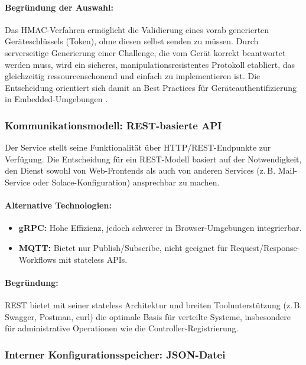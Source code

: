 \paragraph*{Begr\"undung der Auswahl:}

Das HMAC-Verfahren erm\"oglicht die Validierung eines vorab generierten Ger\"ateschl\"ussels (Token), ohne diesen selbst senden zu m\"ussen. Durch serverseitige Generierung einer Challenge, die vom Ger\"at korrekt beantwortet werden muss, wird ein sicheres, manipulationsresistentes Protokoll etabliert, das gleichzeitig ressourcenschonend und einfach zu implementieren ist. Die Entscheidung orientiert sich damit an Best Practices f\"ur Ger\"ateauthentifizierung in Embedded-Umgebungen \cite{rfc2104_hmac}.

\subsubsection*{Kommunikationsmodell: REST-basierte API}

Der Service stellt seine Funktionalit\"at \"uber HTTP/REST-Endpunkte zur Verf\"ugung. Die Entscheidung f\"ur ein REST-Modell basiert auf der Notwendigkeit, den Dienst sowohl von Web-Frontends als auch von anderen Services (z.\,B. Mail-Service oder Solace-Konfiguration) ansprechbar zu machen.

\paragraph*{Alternative Technologien:}
\begin{itemize}
  \item \textbf{gRPC:} Hohe Effizienz, jedoch schwerer in Browser-Umgebungen integrierbar.
  \item \textbf{MQTT:} Bietet nur Publish/Subscribe, nicht geeignet f\"ur Request/Response-Workflows mit stateless APIs.
\end{itemize}

\paragraph*{Begr\"undung:}

REST bietet mit seiner stateless Architektur und breiten Toolunterst\"utzung (z.\,B. Swagger, Postman, curl) die optimale Basis f\"ur verteilte Systeme, insbesondere f\"ur administrative Operationen wie die Controller-Registrierung.

\subsubsection*{Interner Konfigurationsspeicher: JSON-Datei}

